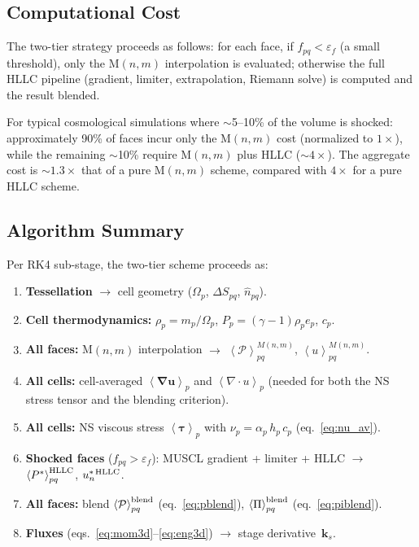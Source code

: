 \documentclass[twocolumn]{aastex63}
\newcommand{\vel}{{u}}
\newcommand{\surf}[0]{S}
\newcommand{\gradT}[1]{\boldsymbol{\nabla#1}}
\newcommand{\pressure}[0]{\mathcal{P}}
\begin{document}
\subsection{Computational Cost}

The two-tier strategy proceeds as follows:
for each face, if $f_{pq} < \varepsilon_f$ (a small
threshold), only the M$(n,m)$ interpolation is
evaluated; otherwise the full HLLC pipeline
(gradient, limiter, extrapolation, Riemann solve)
is computed and the result blended.

For typical cosmological simulations where
$\sim$5--10\% of the volume is shocked:
approximately 90\% of faces incur only the M$(n,m)$
cost (normalized to $1{\times}$), while the remaining
$\sim$10\% require M$(n,m)$ plus HLLC ($\sim\!4{\times}$).
The aggregate cost is $\sim\!1.3{\times}$ that of a pure
M$(n,m)$ scheme, compared with $4{\times}$ for a
pure HLLC scheme.

\subsection{Algorithm Summary}

Per RK4 sub-stage, the two-tier scheme proceeds as:
\begin{enumerate}[label=(\alph*)]
  \item \textbf{Tessellation}
    $\rightarrow$ cell geometry
    ($\Omega_p$, $\Delta\surf_{pq}$, $\hat{n}_{pq}$).
  \item \textbf{Cell thermodynamics:}
    $\rho_p = m_p/\Omega_p$,\;
    $P_p = (\gamma-1)\rho_p e_p$,\;
    $c_p$.
  \item \textbf{All faces:} M$(n,m)$ interpolation
    $\rightarrow$
    $\left<\pressure\right>_{pq}^{M(n,m)}$,\;
    $\left<\vel\right>_{pq}^{M(n,m)}$.
  \item \textbf{All cells:} cell-averaged
    $\left<\gradT{u}\right>_p$ and
    $\left<\nabla\!\cdot\!\vel\right>_p$
    (needed for both the NS stress tensor and the
    blending criterion).
  \item \textbf{All cells:} NS viscous stress
    $\left<\boldsymbol{\tau}\right>_p$
    with $\nu_p = \alpha_p\,h_p\,c_p$
    (eq.~\ref{eq:nu_av}).
  \item \textbf{Shocked faces} ($f_{pq} > \varepsilon_f$):
    MUSCL gradient + limiter + HLLC
    $\rightarrow$
    $\left<P^*\right>_{pq}^{\rm HLLC}$,\;
    $\vel_n^{*\,\rm HLLC}$.
  \item \textbf{All faces:} blend
    $\left<\pressure\right>_{pq}^{\rm blend}$
    (eq.~\ref{eq:pblend}),\;
    $\left<\Pi\right>_{pq}^{\rm blend}$
    (eq.~\ref{eq:piblend}).
  \item \textbf{Fluxes}
    (eqs.~\ref{eq:mom3d}--\ref{eq:eng3d})
    $\rightarrow$ stage derivative~$\mathbf{k}_s$.
\end{enumerate}
\end{document}

